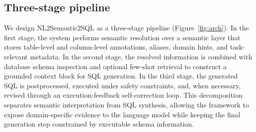 \documentclass[11pt]{article}
\begin{document}
\subsection{Three-stage pipeline}

We design NL2Semantic2SQL as a three-stage pipeline (Figure~\ref{fig:arch}). In the first stage, the system performs semantic resolution over a semantic layer that stores table-level and column-level annotations, aliases, domain hints, and task-relevant metadata. In the second stage, the resolved information is combined with database schema inspection and optional few-shot retrieval to construct a grounded context block for SQL generation. In the third stage, the generated SQL is postprocessed, executed under safety constraints, and, when necessary, revised through an execution-feedback self-correction loop. This decomposition separates semantic interpretation from SQL synthesis, allowing the framework to expose domain-specific evidence to the language model while keeping the final generation step constrained by executable schema information.
\end{document}
